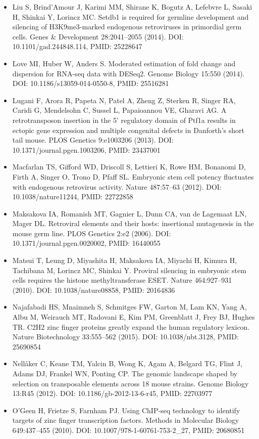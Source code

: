 \documentclass[11pt,a4paper]{article}
\begin{document}
\begin{itemize}
\item Liu S, Brind'Amour J, Karimi MM, Shirane K, Bogutz A, Lefebvre L, Sasaki H, Shinkai Y, Lorincz MC. Setdb1 is required for germline development and silencing of H3K9me3-marked endogenous retroviruses in primordial germ cells. Genes \& Development 28:2041–2055 (2014). DOI: 10.1101/gad.244848.114, PMID: 25228647
\item Love MI, Huber W, Anders S. Moderated estimation of fold change and dispersion for RNA-seq data with DESeq2. Genome Biology 15:550 (2014). DOI: 10.1186/s13059-014-0550-8, PMID: 25516281
\item Lugani F, Arora R, Papeta N, Patel A, Zheng Z, Sterken R, Singer RA, Caridi G, Mendelsohn C, Sussel L, Papaioannou VE, Gharavi AG. A retrotransposon insertion in the 5' regulatory domain of Ptf1a results in ectopic gene expression and multiple congenital defects in Danforth's short tail mouse. PLOS Genetics 9:e1003206 (2013). DOI: 10.1371/journal.pgen.1003206, PMID: 23437001
\item Macfarlan TS, Gifford WD, Driscoll S, Lettieri K, Rowe HM, Bonanomi D, Firth A, Singer O, Trono D, Pfaff SL. Embryonic stem cell potency fluctuates with endogenous retrovirus activity. Nature 487:57–63 (2012). DOI: 10.1038/nature11244, PMID: 22722858
\item Maksakova IA, Romanish MT, Gagnier L, Dunn CA, van de Lagemaat LN, Mager DL. Retroviral elements and their hosts: insertional mutagenesis in the mouse germ line. PLOS Genetics 2:e2 (2006). DOI: 10.1371/journal.pgen.0020002, PMID: 16440055
\item Matsui T, Leung D, Miyashita H, Maksakova IA, Miyachi H, Kimura H, Tachibana M, Lorincz MC, Shinkai Y. Proviral silencing in embryonic stem cells requires the histone methyltransferase ESET. Nature 464:927–931 (2010). DOI: 10.1038/nature08858, PMID: 20164836
\item Najafabadi HS, Mnaimneh S, Schmitges FW, Garton M, Lam KN, Yang A, Albu M, Weirauch MT, Radovani E, Kim PM, Greenblatt J, Frey BJ, Hughes TR. C2H2 zinc finger proteins greatly expand the human regulatory lexicon. Nature Biotechnology 33:555–562 (2015). DOI: 10.1038/nbt.3128, PMID: 25690854
\item Nellåker C, Keane TM, Yalcin B, Wong K, Agam A, Belgard TG, Flint J, Adams DJ, Frankel WN, Ponting CP. The genomic landscape shaped by selection on transposable elements across 18 mouse strains. Genome Biology 13:R45 (2012). DOI: 10.1186/gb-2012-13-6-r45, PMID: 22703977
\item O'Geen H, Frietze S, Farnham PJ. Using ChIP-seq technology to identify targets of zinc finger transcription factors. Methods in Molecular Biology 649:437–455 (2010). DOI: 10.1007/978-1-60761-753-2\_27, PMID: 20680851

\end{itemize}
\end{document}

